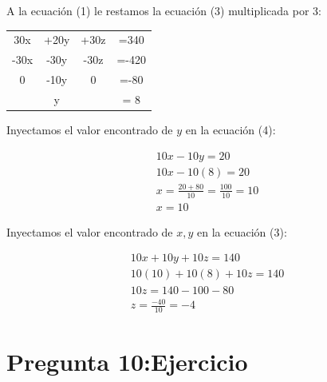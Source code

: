 \documentclass[a4paper, apacite, 12pt, doc]{apa6}
\begin{document}
A la ecuación (1) le restamos la ecuación (3) multiplicada por 3:


\begin{center}
	\begin{tabular}{cccc}
		30x &+20y &+30z &=340 \\
		-30x &-30y &-30z &=-420 \\
		\hline
		0 & -10y & 0 &=-80 \\
		 &    y   &  &= 8
	\end{tabular}
\end{center}

Inyectamos el valor encontrado de $y$ en la ecuación (4):

\begin{gather*}
	10x -10y = 20 \\
	10x -10(8) = 20 \\
	x = \frac{20 + 80}{10} = \frac{100}{10} = 10 \\
	x = 10
\end{gather*}

Inyectamos el valor encontrado de $x,y$ en la ecuación (3):

\begin{gather*}
	10x + 10y + 10z = 140 \\
	10(10) +10(8) +10z = 140 \\
	10z = 140 -100 -80 \\
	z = \frac{-40}{10} = -4
\end{gather*}
\section{Pregunta 10:Ejercicio}









\end{document}
